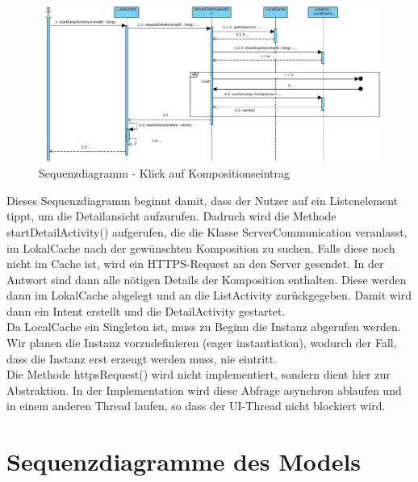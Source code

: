\begin{figure}[h]
	\centering
	\includegraphics[width=\textwidth]{img/Diagramme/Sequenz/App_detail}
	\caption{Sequenzdiagramm - Klick auf Kompositionseintrag}
	\label{fig:sequenz-App_detail}
\end{figure}
\noindent
Dieses Sequenzdiagramm beginnt damit, dass der Nutzer auf ein Listenelement tippt, um die Detailansicht aufzurufen. 
Dadruch wird die Methode startDetailActivity() aufgerufen, die die Klasse ServerCommunication veranlasst, im LokalCache nach der gewünschten Komposition zu suchen.
Falls diese noch nicht im Cache ist, wird ein HTTPS-Request an den Server gesendet.
In der Antwort sind dann alle nötigen Details der Komposition enthalten.
Diese werden dann im LokalCache abgelegt und an die ListActivity zurückgegeben.
Damit wird dann ein Intent erstellt und die DetailActivity gestartet.
\\
Da LocalCache ein Singleton ist, muss zu Beginn die Instanz abgerufen werden. Wir planen die Instanz vorzudefinieren (eager instantiation), wodurch der Fall, dass die Instanz erst erzeugt werden muss, nie eintritt.
\\
Die Methode httpsRequest() wird nicht implementiert, sondern dient hier zur Abstraktion. In der Implementation wird diese Abfrage asynchron ablaufen und in einem anderen Thread laufen, so dass der UI-Thread nicht blockiert wird. 

\section*{Sequenzdiagramme des Models}

